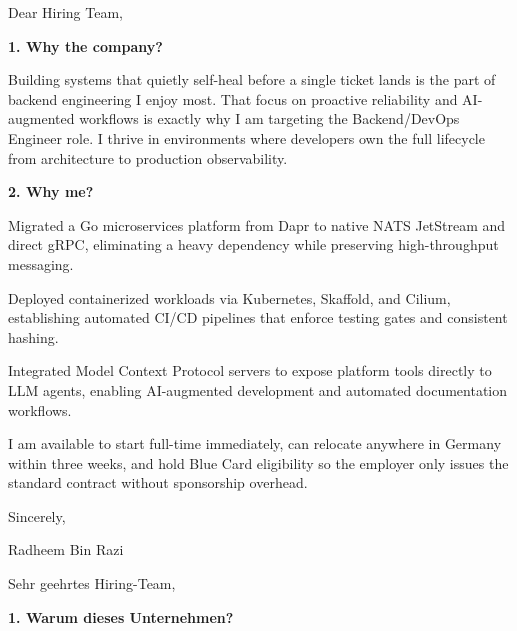\documentclass[11pt,a4paper]{coverletter}
\begin{document}

\opening{Dear Hiring Team,}

\vspace{8pt}\noindent\textbf{1. Why the company?}\par\vspace{3pt}

Building systems that quietly self-heal before a single ticket lands is the part of backend engineering I enjoy most. That focus on proactive reliability and AI-augmented workflows is exactly why I am targeting the Backend/DevOps Engineer role. I thrive in environments where developers own the full lifecycle from architecture to production observability.

\vspace{8pt}\noindent\textbf{2. Why me?}\par\vspace{3pt}

\bullets

  \item Migrated a Go microservices platform from Dapr to native NATS JetStream and direct gRPC, eliminating a heavy dependency while preserving high-throughput messaging.

  \item Deployed containerized workloads via Kubernetes, Skaffold, and Cilium, establishing automated CI/CD pipelines that enforce testing gates and consistent hashing.

  \item Integrated Model Context Protocol servers to expose platform tools directly to LLM agents, enabling AI-augmented development and automated documentation workflows.

\bulletsend

I am available to start full-time immediately, can relocate anywhere in Germany within three weeks, and hold Blue Card eligibility so the employer only issues the standard contract without sponsorship overhead.

\closing{Sincerely,}{Radheem Bin Razi}

\clearpage
{}


\opening{Sehr geehrtes Hiring-Team,}

\vspace{8pt}\noindent\textbf{1. Warum dieses Unternehmen?}\par\vspace{3pt}
\end{document}

